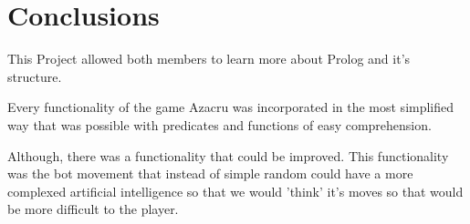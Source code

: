 \documentclass[a4paper]{article}
\begin{document}
\vspace{10mm}
\section{Conclusions}
This Project allowed both members to learn more about Prolog and it's structure.

Every functionality of the game Azacru was incorporated in the most simplified way that was possible with predicates and functions of easy comprehension.

 Although, there was a functionality that could be improved. This functionality was the bot movement that instead of simple random could have a more complexed artificial intelligence so that we would 'think' it's moves so that would be more difficult to the player.



\clearpage
{}
\renewcommand\refname{Bibliography}


\end{document}
